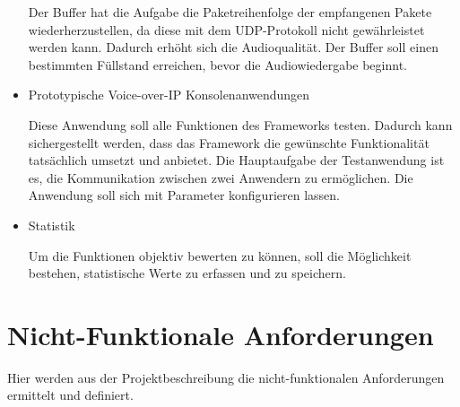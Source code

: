 \begin{itemize}
		Der Buffer hat die Aufgabe die Paketreihenfolge der empfangenen Pakete wiederherzustellen, da diese mit dem UDP-Protokoll nicht gewährleistet werden kann. Dadurch erhöht sich die Audioqualität. Der Buffer soll einen bestimmten Füllstand erreichen, bevor die Audiowiedergabe beginnt.
				
		\item Prototypische Voice-over-IP Konsolenanwendungen

		Diese Anwendung soll alle Funktionen des Frameworks testen. Dadurch kann sichergestellt werden, dass das Framework die gewünschte Funktionalität tatsächlich umsetzt und anbietet. Die Hauptaufgabe der Testanwendung ist es, die Kommunikation zwischen zwei Anwendern zu ermöglichen. Die Anwendung soll sich mit Parameter konfigurieren lassen. 
				
		\item Statistik

		Um die Funktionen objektiv bewerten zu können, soll die Möglichkeit bestehen, statistische Werte zu erfassen und zu speichern.
		
	\end{itemize}
	
\section{Nicht-Funktionale Anforderungen}
Hier werden aus der Projektbeschreibung die nicht-funktionalen Anforderungen ermittelt und definiert.

